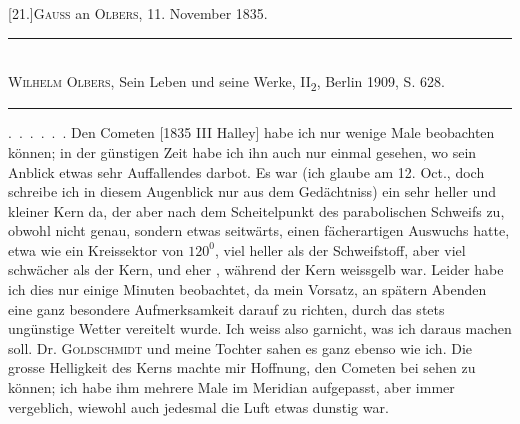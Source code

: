 \clearpage\begingroup
\hypertarget{native-283-21}{}
\begin{center}[21.]\quad \textsc{Gauss} an \textsc{Olbers}, 11. November 1835.\end{center}
\begin{center}\small
\rule{.92\textwidth}{.35pt}\\[.2em]
\textsc{Wilhelm Olbers}, Sein Leben und seine Werke, II\textsubscript{2}, Berlin 1909, S. 628.\\[-.2em]
\rule{.92\textwidth}{.35pt}
\end{center}
\noindent\begin{minipage}[t]{.16\textwidth}
\vspace*{7\baselineskip}
\centering
\end{minipage}\hfill
\begin{minipage}[t]{.80\textwidth}
\setlength{\parindent}{1.2em}
\noindent\hspace*{\parindent}\mbox{. . . . . .} Den Cometen [1835 III Halley] habe ich nur wenige Male beobachten können; in der günstigen Zeit habe ich ihn auch nur einmal gesehen, wo sein Anblick etwas sehr Auffallendes darbot. Es war (ich glaube am 12. Oct., doch schreibe ich in diesem Augenblick nur aus dem Gedächtniss) ein sehr heller und  kleiner Kern da, der aber nach dem Scheitelpunkt des parabolischen Schweifs zu, obwohl nicht genau, sondern etwas seitwärts, einen fächerartigen Auswuchs hatte, etwa wie ein Kreissektor von $120^0$, viel heller als der Schweifstoff, aber viel schwächer als der Kern, und eher , während der Kern weissgelb war. Leider habe ich dies nur einige Minuten beobachtet, da mein Vorsatz, an spätern Abenden eine ganz besondere Aufmerksamkeit darauf zu richten, durch das stets ungünstige Wetter vereitelt wurde. Ich weiss also garnicht, was ich daraus machen soll. Dr. \textsc{Goldschmidt} und meine Tochter sahen es ganz ebenso wie ich. Die grosse Helligkeit des Kerns machte mir Hoffnung, den Cometen bei  sehen zu können; ich habe ihm mehrere Male im Meridian aufgepasst, aber immer vergeblich, wiewohl auch jedesmal die Luft etwas dunstig war.
\end{minipage}
\clearpage\endgroup
